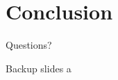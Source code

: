 \documentclass[10pt]{beamer}
\begin{document}
\section{Conclusion}

\begin{frame}[standout]
  Questions?
\end{frame}

\appendix

\begin{frame}[fragile]{Backup slides}
a
\end{frame}
\end{document}
